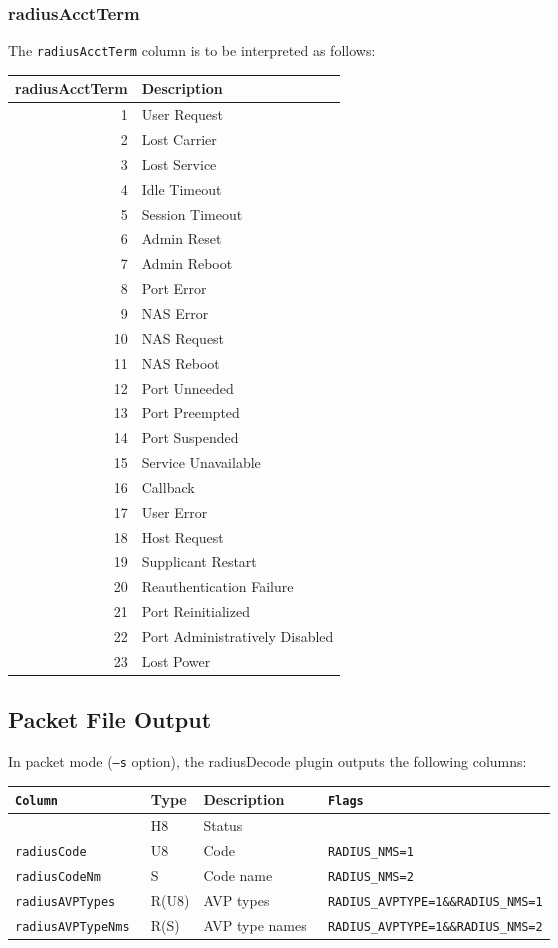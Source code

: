 \documentclass[documentation]{subfiles}
\begin{document}
\subsubsection{radiusAcctTerm}\label{radiusAcctTerm}
The {\tt radiusAcctTerm} column is to be interpreted as follows:
\begin{longtable}{rl}
    \toprule
    {\bf radiusAcctTerm} & {\bf Description}\\
    \midrule\endhead%
     1 & User Request\\
     2 & Lost Carrier\\
     3 & Lost Service\\
     4 & Idle Timeout\\
     5 & Session Timeout\\
     6 & Admin Reset\\
     7 & Admin Reboot\\
     8 & Port Error\\
     9 & NAS Error\\
    10 & NAS Request\\
    11 & NAS Reboot\\
    12 & Port Unneeded\\
    13 & Port Preempted\\
    14 & Port Suspended\\
    15 & Service Unavailable\\
    16 & Callback\\
    17 & User Error\\
    18 & Host Request\\
    19 & Supplicant Restart\\
    20 & Reauthentication Failure\\
    21 & Port Reinitialized\\
    22 & Port Administratively Disabled\\
    23 & Lost Power\\
    \bottomrule
\end{longtable}

\subsection{Packet File Output}
In packet mode ({\tt --s} option), the radiusDecode plugin outputs the following columns:
\begin{longtable}{>{\tt}lll>{\tt\small}l}
    \toprule
    {\bf Column} & {\bf Type} & {\bf Description} & {\bf Flags}\\
    \midrule\endhead%
    \nameref{radiusStat} & H8    & Status         & \\
    radiusCode           & U8    & Code           & RADIUS\_NMS=1\\
    radiusCodeNm         & S     & Code name      & RADIUS\_NMS=2\\
    radiusAVPTypes       & R(U8) & AVP types      & RADIUS\_AVPTYPE=1\&\&RADIUS\_NMS=1\\
    radiusAVPTypeNms     & R(S)  & AVP type names & RADIUS\_AVPTYPE=1\&\&RADIUS\_NMS=2\\
    \bottomrule
\end{longtable}
\end{document}
